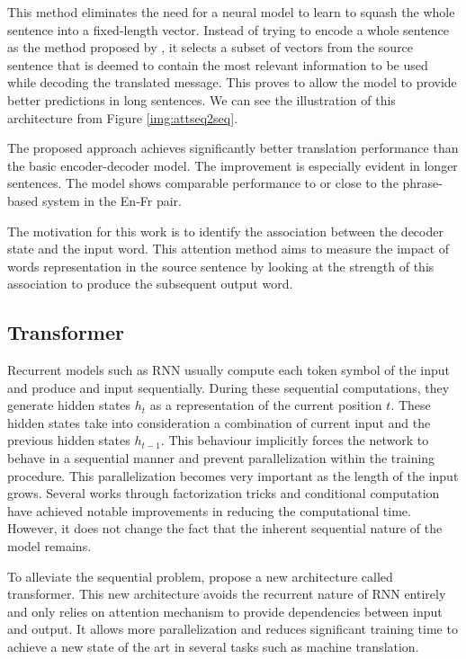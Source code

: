 This method eliminates the need for a neural model to learn to squash the whole sentence into a fixed-length vector. Instead of trying to encode a whole sentence as the method proposed by \cite{sutskever2014sequence}, it selects a subset of vectors from the source sentence that is deemed to contain the most relevant information to be used while decoding the translated message. This proves to allow the model to provide better predictions in long sentences. We can see the illustration of this architecture from Figure \ref{img:attseq2seq}.


The proposed approach achieves significantly better translation performance than the basic encoder-decoder model. The improvement is especially evident in longer sentences. The model shows comparable performance to or close to the phrase-based system in the En-Fr pair.

The motivation for this work is to identify the association between the decoder state and the input word. This attention method aims to measure the impact of words representation in the source sentence by looking at the strength of this association to produce the subsequent output word.

\subsection{Transformer}
Recurrent models such as RNN usually compute each token symbol of the input and produce and input sequentially. During these sequential computations, they generate hidden states $h_t$ as a representation of the current position $t$. These hidden states take into consideration a combination of current input and the previous hidden states $h_{t-1}$. This behaviour implicitly forces the network to behave in a sequential manner and prevent parallelization within the training procedure. This parallelization becomes very important as the length of the input grows. Several works through factorization tricks \cite{Kuchaiev2017FactorizationTF} and conditional computation \cite{Shazeer2017OutrageouslyLN} have achieved notable improvements in reducing the computational time. However, it does not change the fact that the inherent sequential nature of the model remains.

To alleviate the sequential problem, \cite{vaswani2017attention} propose a new architecture called transformer. This new architecture avoids the recurrent nature of RNN entirely and only relies on  attention mechanism to provide dependencies between input and output. It allows more parallelization and reduces significant training time to achieve a new state of the art in several tasks such as machine translation.

